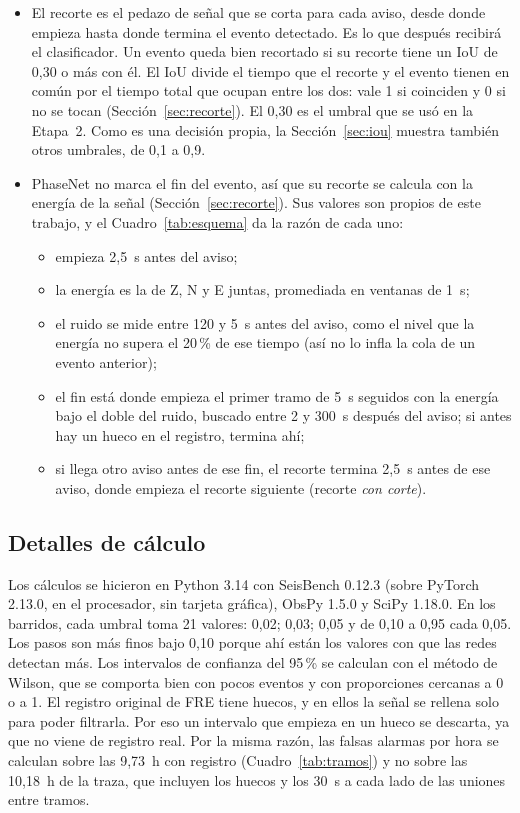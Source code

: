 \documentclass[11pt,a4paper,oneside,spanish,oldfontcommands]{memoir}
\begin{document}
\begin{itemize}
  energía es solo de PhaseNet; en EQTransformer y STA/LTA se usa el intervalo
  que entrega su librería.
\item El recorte es el pedazo de señal que se corta para cada aviso, desde donde
  empieza hasta donde termina el evento detectado. Es lo que después recibirá el
  clasificador. Un evento queda bien recortado si su recorte tiene un IoU de
  0,30 o más con él. El IoU divide el tiempo que el recorte y el evento tienen en
  común por el tiempo total que ocupan entre los dos: vale 1 si coinciden y 0 si  no se tocan (Sección~\ref{sec:recorte}). El 0,30 es el umbral que se usó en
  la Etapa~2. Como es una decisión propia, la Sección~\ref{sec:iou} muestra
  también otros umbrales, de 0,1 a 0,9.
\item PhaseNet no marca el fin del evento, así que su recorte se calcula con la  energía de la señal (Sección~\ref{sec:recorte}). Sus valores son propios de
  este trabajo, y el Cuadro~\ref{tab:esquema} da la razón de cada uno:
  \begin{itemize}
  \item empieza 2,5~s antes del aviso;
  \item la energía es la de Z, N y E juntas, promediada en ventanas de 1~s;
  \item el ruido se mide entre 120 y 5~s antes del aviso, como el nivel que la
    energía no supera el 20\,\% de ese tiempo (así no lo infla la cola de un
    evento anterior);
  \item el fin está donde empieza el primer tramo de 5~s seguidos con la
    energía bajo el doble del ruido, buscado entre 2 y 300~s después del aviso;
    si antes hay un hueco en el registro, termina ahí;
  \item si llega otro aviso antes de ese fin, el recorte termina 2,5~s antes de
    ese aviso, donde empieza el recorte siguiente (recorte \emph{con corte}).
  \end{itemize}
\end{itemize}

\subsection*{Detalles de cálculo}

Los cálculos se hicieron en Python 3.14 con SeisBench 0.12.3 (sobre PyTorch
2.13.0, en el procesador, sin tarjeta gráfica), ObsPy 1.5.0 y SciPy 1.18.0. En
los barridos, cada umbral toma 21 valores: 0,02; 0,03; 0,05
y de 0,10 a 0,95 cada 0,05. Los pasos son más finos bajo 0,10 porque ahí están
los valores con que las redes detectan más. Los intervalos de confianza del 95\,\% se calculan con el
método de Wilson, que se comporta bien con pocos eventos y con proporciones
cercanas a 0 o a 1. El registro original de FRE tiene huecos, y en ellos la señal se
rellena solo para poder filtrarla. Por eso un intervalo que empieza en un hueco
se descarta, ya que no viene de registro real. Por la misma razón, las falsas
alarmas por hora se calculan sobre las 9,73~h con registro
(Cuadro~\ref{tab:tramos}) y no sobre las 10,18~h de la traza, que incluyen los
huecos y los 30~s a cada lado de las uniones entre tramos.
\end{document}
